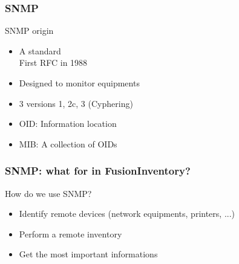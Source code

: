 \documentclass{beamer}
\begin{document}
\begin{frame}
    \frametitle{SNMP}


    \begin{block}{SNMP origin}
    \begin{itemize}
    \item A standard \\
    \small{First RFC in 1988}
    \item Designed to monitor equipments
    \item 3 versions 1, 2c, 3 (Cyphering)
    \item OID: Information location
    \item MIB: A collection of OIDs
    \end{itemize}
    \end{block}
\end{frame}

\begin{frame}
    \frametitle{SNMP: what for in FusionInventory?}

    \begin{block}{How do we use SNMP?}
    \begin{itemize}
    \item Identify remote devices (network equipments, printers, ...)
    \item Perform a remote inventory
    \item Get the most important informations
    \end{itemize}
    \end{block}
\end{frame}
\end{document}
